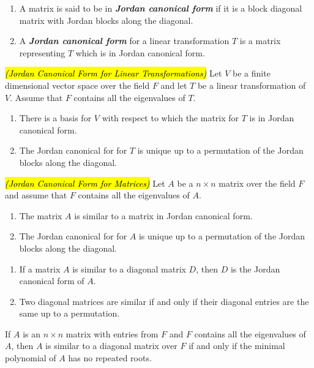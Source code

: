 \begin{defn}\nl
\begin{enumerate}
\item A matrix is said to be in \textit{\textbf{Jordan canonical form}} if it is a block diagonal matrix with Jordan blocks along the diagonal.

\item A \textbf{\textit{Jordan canonical form}} for a linear transformation $T$ is a matrix representing $T$ which is in Jordan canonical form.
\end{enumerate}
\end{defn}

\nl

\begin{thm}\hl{\textit{(Jordan Canonical Form for Linear Transformations)}} Let $V$ be a finite dimensional vector space over the field $F$ and let $T$ be a linear transformation of $V$. Assume that $F$ contains all the eigenvalues of $T$.
\begin{enumerate}
\item There is a basis for $V$ with respect to which the matrix for $T$ is in Jordan canonical form.
\item The Jordan canonical for for $T$ is unique up to a permutation of the Jordan blocks along the diagonal.
\end{enumerate}
\end{thm}

\nl

\begin{thm}\hl{\textit{(Jordan Canonical Form for Matrices)}} Let $A$ be a $n\times n$ matrix over the field $F$ and assume that $F$ contains all the eigenvalues of $A$.
\begin{enumerate}
\item The matrix $A$ is similar to a matrix in Jordan canonical form.
\item The Jordan canonical for for $A$ is unique up to a permutation of the Jordan blocks along the diagonal.
\end{enumerate}
\end{thm}

\nl

\begin{cor}\nl
\begin{enumerate}
\item If a matrix $A$ is similar to a diagonal matrix $D$, then $D$ is the Jordan canonical form of $A$.
\item Two diagonal matrices are similar if and only if their diagonal entries are the same up to a permutation.
\end{enumerate}
\end{cor}

\nl

\begin{cor}
If $A$ is an $n\times n$ matrix with entries from $F$ and $F$ contains all the eigenvalues of $A$, then $A$ is similar to a diagonal matrix over $F$ if and only if the minimal polynomial of $A$ has no repeated roots.
\end{cor}

